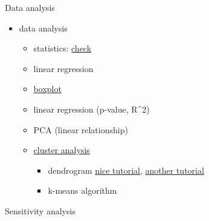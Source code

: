 \documentclass[8pt,ignorenonframetext,]{beamer}
\providecommand{\tightlist}{%
  \setlength{\itemsep}{0pt}\setlength{\parskip}{0pt}}
\begin{document}
\begin{frame}{Data analysis}

\begin{itemize}
\tightlist
\item
  data analysis

  \begin{itemize}
  \tightlist
  \item
    statistics:
    \href{https://www.hydrology.uni-kiel.de/de/mitarbeiter/Statistics}{check}
  \item
    linear regression
  \item
    \href{https://cran.r-project.org/web/packages/beanplot/vignettes/beanplot.pdf}{boxplot}
  \item
    linear regression (p-value, R\^{}2)
  \item
    PCA (linear relationship)
  \item
    \href{http://www.sthda.com/english/articles/25-cluster-analysis-in-r-practical-guide/111-types-of-clustering-methods-overview-and-quick-start-r-code/}{cluster
    analysis}

    \begin{itemize}
    \tightlist
    \item
      dendrogram
      \href{http://www.sthda.com/english/wiki/beautiful-dendrogram-visualizations-in-r-5-must-known-methods-unsupervised-machine-learning}{nice
      tutorial}, \href{https://rpubs.com/gaston/dendrograms}{another
      tutorial}
    \item
      k-means algorithm
    \end{itemize}
  \end{itemize}
\end{itemize}

\end{frame}

\begin{frame}{Sensitivity analysis}

\end{frame}
\end{document}
